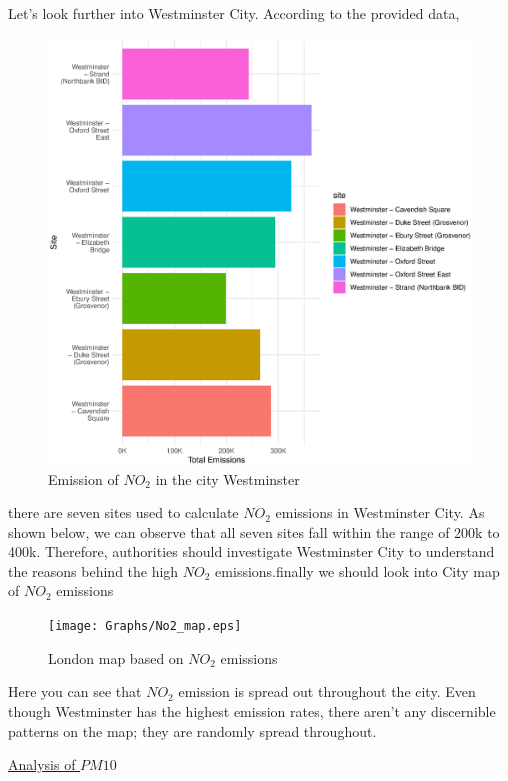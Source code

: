 \documentclass[]{article}
\begin{document}
Let's look further into Westminster City. According to the provided data, 

\begin{figure}[H]
	\centering
	\includegraphics[width=1\textwidth]{Graphs/no2_by_Westminister_graph.eps}
	\caption{Emission of $NO_2$ in the city Westminster}
	\label{fig:no2.2 }
\end{figure}

there are seven sites used to calculate $NO_2$ emissions in Westminster City. As shown below, we can observe that all seven sites fall within the range of 200k to 400k. Therefore, authorities should investigate Westminster City to understand the reasons behind the high $NO_2$ emissions.finally we should look into City map of $NO_2$ emissions

\begin{figure}[H]
	\centering
	\texttt{[image: Graphs/No2\_map.eps]}
	\caption{London map based on $NO_2$ emissions }
	\label{fig:no2.3 }
\end{figure}

Here you can see that $NO_2$ emission is spread out throughout the city. Even though Westminster has the highest emission rates, there aren't any discernible patterns on the map; they are randomly spread throughout.
\pagebreak

\vspace{12pt}
\underline{{\large Analysis of $PM10$}}
\vspace{12pt}
\end{document}
